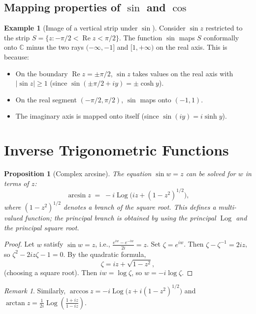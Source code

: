 \documentclass[12pt,a4paper,openany]{book}
\theoremstyle{definition}
\newtheorem{example}[definition]{Example}
\theoremstyle{plain}
\newtheorem{proposition}[definition]{Proposition}
\theoremstyle{remark}
\newtheorem{remark}[definition]{Remark}
\newcommand{\C}{\mathbb{C}}
\DeclareMathOperator{\re}{Re}
\DeclareMathOperator{\Log}{Log}
\newcommand{\abs}[1]{\left|#1\right|}
\begin{document}
\subsection{Mapping properties of $\sin$ and $\cos$}

\begin{example}[Image of a vertical strip under $\sin$]\label{ex:sin-vertical-strip}
Consider $\sin z$ restricted to the strip $S = \{z : -\pi/2 < \re z < \pi/2\}$.
The function $\sin$ maps $S$ conformally onto $\C$ minus the two rays
$(-\infty,-1]$ and $[1,+\infty)$ on the real axis.  This is because:
\begin{itemize}
  \item On the boundary $\re z = \pm\pi/2$, $\sin z$ takes values on the
    real axis with $\abs{\sin z}\ge 1$ (since $\sin(\pm\pi/2+iy)=\pm\cosh y$).
  \item On the real segment $(-\pi/2,\pi/2)$, $\sin$ maps onto $(-1,1)$.
  \item The imaginary axis is mapped onto itself (since $\sin(iy) = i\sinh y$).
\end{itemize}
\end{example}

\section{Inverse Trigonometric Functions}
\label{sec:inverse-trig}

\begin{proposition}[Complex arcsine]\label{prop:arcsin}
The equation $\sin w = z$ can be solved for $w$ in terms of $z$:
\[
  \arcsin z \;=\; -i\Log\bigl(iz + (1-z^2)^{1/2}\bigr),
\]
where $(1-z^2)^{1/2}$ denotes a branch of the square root.  This defines a
multi-valued function; the principal branch is obtained by using the principal
$\Log$ and the principal square root.
\end{proposition}

\begin{proof}
Let $w$ satisfy $\sin w = z$, i.e., $\frac{e^{iw}-e^{-iw}}{2i} = z$.
Set $\zeta = e^{iw}$.  Then $\zeta - \zeta^{-1} = 2iz$, so
$\zeta^2 - 2iz\zeta - 1 = 0$.  By the quadratic formula,
\[
  \zeta = iz + \sqrt{1-z^2},
\]
(choosing a square root).  Then $iw = \log\zeta$, so $w = -i\log\zeta$.
\end{proof}

\begin{remark}\label{rem:arccos}
Similarly, $\arccos z = -i\Log\bigl(z + i(1-z^2)^{1/2}\bigr)$ and
$\arctan z = \frac{1}{2i}\Log\!\left(\frac{1+iz}{1-iz}\right)$.
\end{remark}
\end{document}
